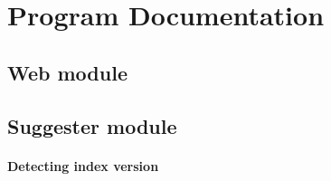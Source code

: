 \chapter{Program Documentation}
\label{chap:program}

\section{Web module}
\section{Suggester module}

\subsubsection{Detecting index version}
